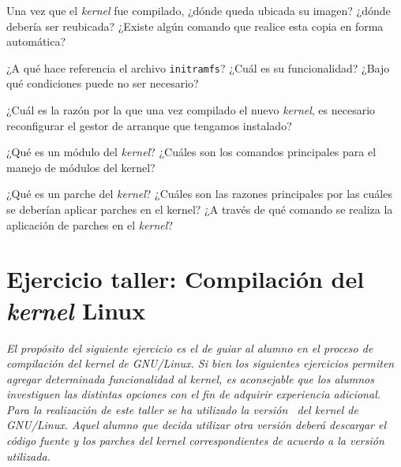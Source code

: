 \begin{questions}

  \question Una vez que el \textit{kernel} fue compilado, ¿dónde queda ubicada su
  imagen? ¿dónde debería ser reubicada? ¿Existe algún comando que realice
  esta copia en forma automática?

  \question ¿A qué hace referencia el archivo \texttt{initramfs}? ¿Cuál es
  su funcionalidad?  ¿Bajo qué condiciones puede no ser necesario?

  \question ¿Cuál es la razón por la que una vez compilado el nuevo \textit{kernel},
  es necesario reconfigurar el gestor de arranque que tengamos instalado?

  \question ¿Qué es un módulo del \textit{kernel}? ¿Cuáles son los comandos
  principales para el manejo de módulos del kernel?

  \question ¿Qué es un parche del \textit{kernel}? ¿Cuáles son las razones
  principales por las cuáles se deberían aplicar parches en el kernel? ¿A
  través de qué comando se realiza la aplicación de parches en el
  \textit{kernel}?
\end{questions}

\section{Ejercicio taller: Compilación del \textit{kernel} Linux}
\textit{El propósito del siguiente ejercicio es el de guiar al alumno en el
  proceso de compilación del \textit{kernel} de GNU/Linux. Si bien los
  siguientes ejercicios permiten agregar determinada funcionalidad al
  \textit{kernel}, es aconsejable que los alumnos investiguen las distintas
  opciones con el fin de adquirir experiencia adicional. Para la
  realización de este taller se ha utilizado la versión \KERNELBASEVERSION\
  del \textit{kernel} de GNU/Linux. Aquel alumno que decida utilizar otra
  versión deberá descargar el código fuente y los parches del
  \textit{kernel} correspondientes de acuerdo a la versión utilizada.  }

